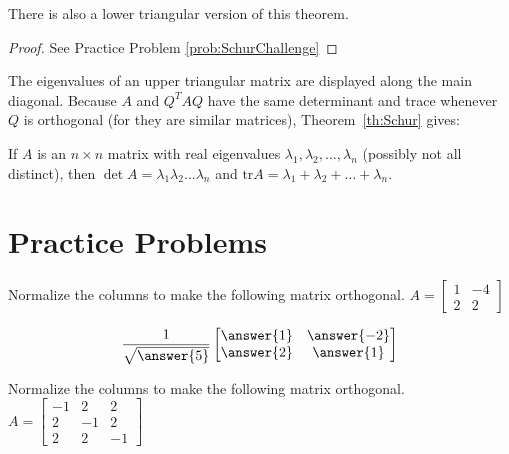 \documentclass{ximera}
\begin{document}
\begin{remark}There is also a lower triangular version of this theorem.
\end{remark}

\begin{proof}
See Practice Problem \ref{prob:SchurChallenge}
\end{proof}

The eigenvalues of an upper triangular matrix are displayed along the main diagonal. Because $A$ and $Q^{T}AQ$ have the same determinant and trace whenever $Q$ is orthogonal (for they are similar matrices), Theorem~\ref{th:Schur} gives:

\begin{corollary}\label{cor:det_and_tr}
If $A$ is an $n \times n$ matrix with real eigenvalues $\lambda_{1}, \lambda_{2}, \dots, \lambda_{n}$ (possibly not all distinct), then $\det A = \lambda_{1}\lambda_{2} \dots \lambda_{n}$ and $\mbox{tr} A = \lambda_{1} + \lambda_{2} + \dots  + \lambda_{n}$.
\end{corollary}

\section*{Practice Problems}

\begin{problem}\label{prob:make_ortho_matrix3}
Normalize the columns to make the following matrix orthogonal.
$A = \begin{bmatrix}
1 & -4 \\
2 & 2
\end{bmatrix}$

$$\frac{1}{\sqrt{\answer{5}}}\begin{bmatrix}\answer{1} & \answer{-2}\\\answer{2} & \answer{1}\end{bmatrix}$$
\end{problem}

\begin{problem}\label{prob:make_ortho_matrix7}
Normalize the columns to make the following matrix orthogonal.
$A = \begin{bmatrix}
-1 & 2 & 2 \\
2 & -1 & 2 \\
2 & 2 & -1
\end{bmatrix}$
\end{problem}
\end{document}

